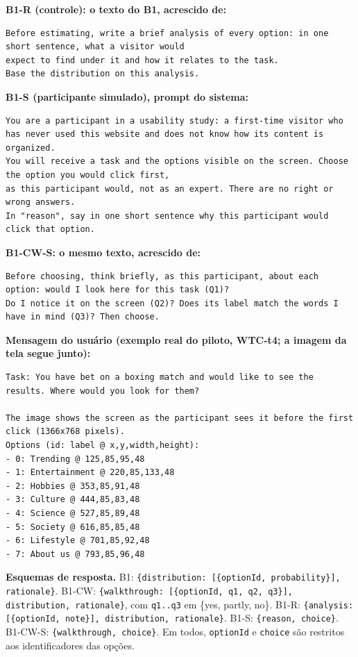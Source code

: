 \documentclass[12pt]{article}
\newcommand{\code}[1]{\texttt{#1}}
\begin{document}
\textbf{B1-R (controle): o texto do B1, acrescido de:}
\begin{lstlisting}
Before estimating, write a brief analysis of every option: in one short sentence, what a visitor would
expect to find under it and how it relates to the task.
Base the distribution on this analysis.
\end{lstlisting}

\textbf{B1-S (participante simulado), prompt do sistema:}
\begin{lstlisting}
You are a participant in a usability study: a first-time visitor who has never used this website and does not know how its content is organized.
You will receive a task and the options visible on the screen. Choose the option you would click first,
as this participant would, not as an expert. There are no right or wrong answers.
In "reason", say in one short sentence why this participant would click that option.
\end{lstlisting}

\textbf{B1-CW-S: o mesmo texto, acrescido de:}
\begin{lstlisting}
Before choosing, think briefly, as this participant, about each option: would I look here for this task (Q1)?
Do I notice it on the screen (Q2)? Does its label match the words I have in mind (Q3)? Then choose.
\end{lstlisting}

\textbf{Mensagem do usuário (exemplo real do piloto, WTC-t4; a imagem da tela segue junto):}
\begin{lstlisting}
Task: You have bet on a boxing match and would like to see the results. Where would you look for them?

The image shows the screen as the participant sees it before the first click (1366x768 pixels).
Options (id: label @ x,y,width,height):
- 0: Trending @ 125,85,95,48
- 1: Entertainment @ 220,85,133,48
- 2: Hobbies @ 353,85,91,48
- 3: Culture @ 444,85,83,48
- 4: Science @ 527,85,89,48
- 5: Society @ 616,85,85,48
- 6: Lifestyle @ 701,85,92,48
- 7: About us @ 793,85,96,48
\end{lstlisting}

\textbf{Esquemas de resposta.} B1: \code{\{distribution: [\{optionId, probability\}], rationale\}}. B1-CW: \code{\{walkthrough: [\{optionId, q1, q2, q3\}], distribution, rationale\}}, com \code{q1..q3} em \{yes, partly, no\}. B1-R: \code{\{analysis: [\{optionId, note\}], distribution, rationale\}}. B1-S: \code{\{reason, choice\}}. B1-CW-S: \code{\{walkthrough, choice\}}. Em todos, \code{optionId} e \code{choice} são restritos aos identificadores das opções.
\end{document}
